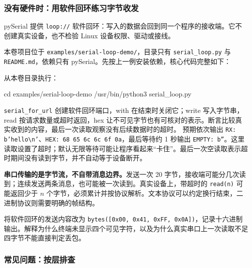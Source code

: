 \subsubsection{没有硬件时：用软件回环练习字节收发}

pySerial 提供 \texttt{loop://} 软件回环：写入的数据会回到同一个程序的接收端。它不创建真实设备，也不检验 Linux 设备权限、驱动或接线。

\begin{example}[验证原始字节与读取超时]
本卷项目位于 \texttt{examples/serial-loop-demo/}，目录只有 \texttt{serial\_loop.py} 与 \texttt{README.md}，依赖只有 pySerial。先按上一例安装依赖，核心代码完整如下：



从本卷目录执行：


\begin{tbash}
cd examples/serial-loop-demo
/usr/bin/python3 serial_loop.py
\end{tbash}


\texttt{serial\_for\_url} 创建软件回环端口，with 在结束时关闭它；write 写入字节串，read 按请求数量或超时返回，hex 让不可见字节也有可核对的表示。断言比较真实收到的内容，最后一次读取观察没有后续数据时的超时。
预期依次输出 \texttt{RX: b'hello\textbackslash n'}、\texttt{HEX: 68 65 6c 6c 6f 0a}，最后等待约 1 秒输出 \texttt{EMPTY: b''}。这里读取设置了超时；默认无限等待可能让程序看起来“卡住”。最后一次空读取表示超时期间没有读到字节，并不自动等于设备断开。
\end{example}

\textbf{串口传输的是字节流，不自带消息边界。}发送一次 20 字节，接收端可能分几次读到；连续发送两条消息，也可能被一次读到。真实设备上，带超时的 \texttt{read(n)} 可能返回少于 $n$ 个字节，必须累计并按协议解析。文本协议可以约定换行结束，二进制协议则需要明确的帧结构。

\begin{exercise}\label{ex:serial-bytes}
将软件回环的发送内容改为 \texttt{bytes([0x00, 0x41, 0xFF, 0x0A])}，记录十六进制输出。解释为什么终端未显示四个可见字符，以及为什么真实串口上一次读取不足四字节不能直接判定丢包。
\end{exercise}

\subsubsection{常见问题：按层排查}

